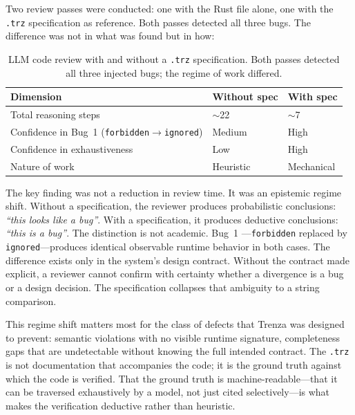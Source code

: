 Two review passes were conducted: one with the Rust file alone, one with the
\texttt{.trz} specification as reference. Both passes detected all three bugs.
The difference was not in what was found but in how:

\begin{table}[h]
  \caption{LLM code review with and without a \texttt{.trz} specification.
           Both passes detected all three injected bugs; the regime of work
           differed.}
  \label{tab:review}
  \small
  \begin{tabular}{p{3.0cm}p{1.5cm}p{1.9cm}}
    \toprule
    Dimension & Without spec & With spec \\
    \midrule
    Total reasoning steps                            & $\sim$22  & $\sim$7 \\
    Confidence in Bug~1 (\texttt{forbidden}$\to$\texttt{ignored}) & Medium & High \\
    Confidence in exhaustiveness                     & Low       & High \\
    Nature of work                                   & Heuristic & Mechanical \\
    \bottomrule
  \end{tabular}
\end{table}

The key finding was not a reduction in review time. It was an epistemic regime
shift. Without a specification, the reviewer produces probabilistic conclusions:
\emph{``this looks like a bug''}. With a specification, it produces deductive
conclusions: \emph{``this is a bug''}. The distinction is not academic. Bug~1
---\texttt{forbidden} replaced by \texttt{ignored}---produces identical
observable runtime behavior in both cases. The difference exists only in the
system's design contract. Without the contract made explicit, a reviewer cannot
confirm with certainty whether a divergence is a bug or a design decision. The
specification collapses that ambiguity to a string comparison.

This regime shift matters most for the class of defects that Trenza was designed
to prevent: semantic violations with no visible runtime signature, completeness
gaps that are undetectable without knowing the full intended contract. The
\texttt{.trz} is not documentation that accompanies the code; it is the ground
truth against which the code is verified. That the ground truth is
machine-readable---that it can be traversed exhaustively by a model, not just
cited selectively---is what makes the verification deductive rather than
heuristic.

